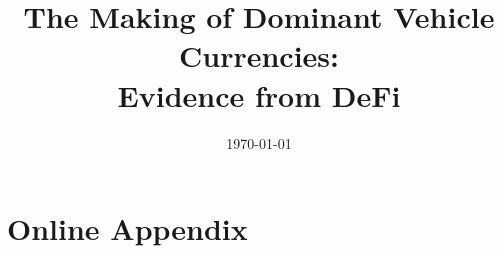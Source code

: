\documentclass[12pt]{article}
\title{The Making of Dominant Vehicle Currencies:\\Evidence from DeFi}
\author{}
\date{\today}
\begin{document}
\maketitle

\begin{abstract}

\end{abstract}







\clearpage


\clearpage
\section*{Online Appendix}

\end{document}
